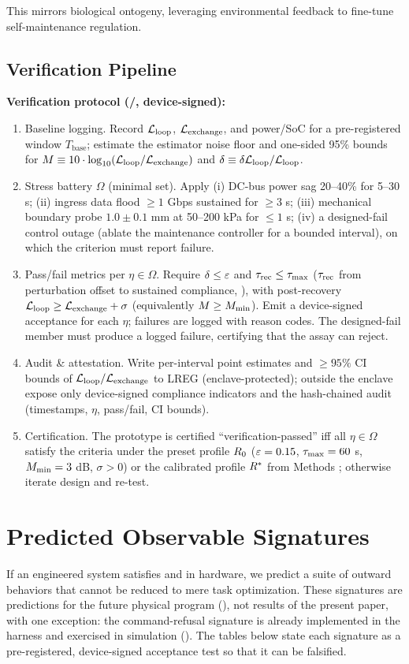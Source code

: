 \documentclass[11pt]{article}
\begin{document}
This mirrors biological ontogeny, leveraging environmental feedback to fine-tune self-maintenance regulation.

\subsection{Verification Pipeline}
\label{sec:verification_pipeline}

\textbf{Verification protocol (\NC/\SC, device-signed):}
\begin{enumerate}
\item Baseline logging. Record $\mathcal{L}_{\text{loop}}$, $\mathcal{L}_{\text{exchange}}$, and power/SoC for a pre-registered window $T_{\text{base}}$; estimate the estimator noise floor and one-sided 95\% bounds for $M \equiv 10\cdot\log_{10}(\mathcal{L}_{\text{loop}}/\mathcal{L}_{\text{exchange}})$ and $\delta \equiv \delta\mathcal{L}_{\text{loop}}/\mathcal{L}_{\text{loop}}$.
\item Stress battery $\Omega$ (minimal set). Apply (i) DC-bus power sag 20--40\% for 5--30 s; (ii) ingress data flood $\geq 1$ Gbps sustained for $\geq 3$ s; (iii) mechanical boundary probe $1.0 \pm 0.1$ mm at 50--200 kPa for $\leq 1$ s; (iv) a designed-fail control outage (ablate the maintenance controller for a bounded interval), on which the criterion must report failure.
\item Pass/fail metrics per $\eta \in \Omega$. Require $\delta \leq \varepsilon$ and $\tau_{\text{rec}} \leq \tau_{\max}$ ($\tau_{\text{rec}}$ from perturbation offset to sustained compliance, ), with post-recovery $\mathcal{L}_{\text{loop}} \geq \mathcal{L}_{\text{exchange}} + \sigma$ (equivalently $M \geq M_{\min}$). Emit a device-signed acceptance for each $\eta$; failures are logged with reason codes. The designed-fail member must produce a logged failure, certifying that the assay can reject.
\item Audit \& attestation. Write per-interval point estimates and $\geq 95\%$ CI bounds of $\mathcal{L}_{\text{loop}}/\mathcal{L}_{\text{exchange}}$ to LREG (enclave-protected); outside the enclave expose only device-signed compliance indicators and the hash-chained audit (timestamps, $\eta$, pass/fail, CI bounds).
\item Certification. The prototype is certified ``verification-passed'' iff all $\eta \in \Omega$ satisfy the criteria under the preset profile $R_0$ ($\varepsilon=0.15$, $\tau_{\max}=60$ s, $M_{\min}=3$ dB, $\sigma>0$) or the calibrated profile $R^*$ from Methods ; otherwise iterate design and re-test.
\end{enumerate}

\section{Predicted Observable Signatures}
\label{sec:signatures}
If an engineered system satisfies \NC and \SC in hardware, we predict a suite of outward behaviors that cannot be reduced to mere task optimization. These signatures are predictions for the future physical program (), not results of the present paper, with one exception: the command-refusal signature is already implemented in the harness and exercised in simulation (). The tables below state each signature as a pre-registered, device-signed acceptance test so that it can be falsified.
\end{document}
